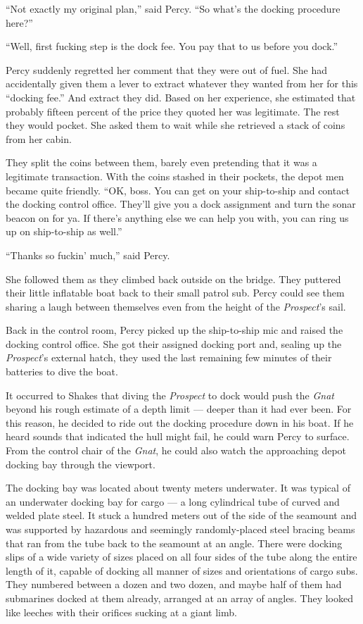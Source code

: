 \documentclass[
]{scrbook}
\begin{document}
``Not exactly my original plan,'' said Percy. ``So what's the docking
procedure here?''

``Well, first fucking step is the dock fee. You pay that to us before
you dock.''

Percy suddenly regretted her comment that they were out of fuel. She had
accidentally given them a lever to extract whatever they wanted from her
for this ``docking fee.'' And extract they did. Based on her experience,
she estimated that probably fifteen percent of the price they quoted her
was legitimate. The rest they would pocket. She asked them to wait while
she retrieved a stack of coins from her cabin.

They split the coins between them, barely even pretending that it was a
legitimate transaction. With the coins stashed in their pockets, the
depot men became quite friendly. ``OK, boss. You can get on your
ship-to-ship and contact the docking control office. They'll give you a
dock assignment and turn the sonar beacon on for ya. If there's anything
else we can help you with, you can ring us up on ship-to-ship as well.''

``Thanks so fuckin' much,'' said Percy.

She followed them as they climbed back outside on the bridge. They
puttered their little inflatable boat back to their small patrol sub.
Percy could see them sharing a laugh between themselves even from the
height of the \emph{Prospect}'s sail.

\bigskip

Back in the control room, Percy picked up the ship-to-ship mic and
raised the docking control office. She got their assigned docking port
and, sealing up the \emph{Prospect}'s external hatch, they used the last
remaining few minutes of their batteries to dive the boat.

It occurred to Shakes that diving the \emph{Prospect} to dock would push
the \emph{Gnat} beyond his rough estimate of a depth limit --- deeper
than it had ever been. For this reason, he decided to ride out the
docking procedure down in his boat. If he heard sounds that indicated
the hull might fail, he could warn Percy to surface. From the control
chair of the \emph{Gnat}, he could also watch the approaching depot
docking bay through the viewport.

The docking bay was located about twenty meters underwater. It was
typical of an underwater docking bay for cargo --- a long cylindrical
tube of curved and welded plate steel. It stuck a hundred meters out of
the side of the seamount and was supported by hazardous and seemingly
randomly-placed steel bracing beams that ran from the tube back to the
seamount at an angle. There were docking slips of a wide variety of
sizes placed on all four sides of the tube along the entire length of
it, capable of docking all manner of sizes and orientations of cargo
subs. They numbered between a dozen and two dozen, and maybe half of
them had submarines docked at them already, arranged at an array of
angles. They looked like leeches with their orifices sucking at a giant
limb.
\end{document}
